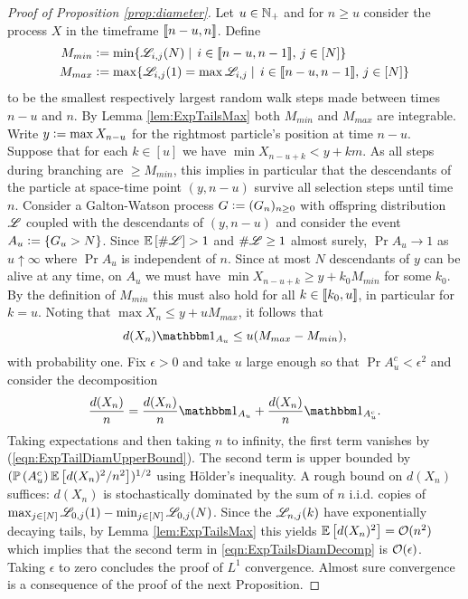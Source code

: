 \begin{proof}[Proof of Proposition \ref{prop:diameter}]
Let $u \in \N_+$ and for $n \geq u$ consider the process $X$ in the timeframe $\bbracket{n - u, n}$. Define 
\begin{align*}
M_{min} &\defeq \min\{ \scr{L}_{i, j}(N) \mid\, i \in \bbracket{n-u, n-1},\, j \in [N]\} \\
M_{max} &\defeq \max\{ \scr{L}_{i, j}(1) = \max\scr{L}_{i,j} \mid\, i \in \bbracket{n-u, n-1},\, j \in [N]\}
\end{align*} 
to be the smallest respectively largest random walk steps made between times $n-u$ and $n$. By Lemma \ref{lem:ExpTailsMax} both $M_{min}$ and $M_{max}$ are integrable. Write $y \defeq \max X_{n - u}$ for the rightmost particle's position at time $n-u$. \\

Suppose that for each $k \in [u]$ we have $\min X_{n - u + k} < y + k m$. As all steps during branching are $ \geq M_{min}$, this implies in particular that the descendants of the particle at space-time point $(y, n-u)$ survive all selection steps until time $n$. Consider a Galton-Watson process $G \defeq (G_n)_{n \geq 0}$ with offspring distribution $\scr{L}$ coupled with the descendants of $(y, n-u)$ and consider the event $A_u \defeq \{ G_u > N\}$. Since $\Ex{\#\scr{L}} > 1$ and $\#\scr{L} \geq 1$ almost surely, $\Pr{A_u} \to 1$ as $u \uparrow \infty$ where $\Pr{A_u}$ is independent of $n$. Since at most $N$ descendants of $y$ can be alive at any time, on $A_u$ we must have $\min X_{n - u + k} \geq y + k_0 M_{min}$ for some $k_0$. By the definition of $M_{min}$ this must also hold for all $k \in \bbracket{k_0, u}$, in particular for $k = u$. Noting that $\max X_n \leq y + u M_{max}$, it follows that 
\begin{equation}\label{eqn:ExpTailDiamUpperBound}
d(X_n)\Ind_{A_u} \leq u (M_{max} - M_{min}), 
\end{equation}
with probability one. Fix $\epsilon > 0$ and take $u$ large enough so that $\Pr{A_u^c} < \epsilon^2$ and consider the decomposition
\begin{equation}\label{eqn:ExpTailsDiamDecomp}
\frac{d(X_n)}{n} = \frac{d(X_n)}{n} \Ind_{A_u} + \frac{d(X_n)}{n} \Ind_{A_u^c}. 
\end{equation}
Taking expectations and then taking $n$ to infinity, the first term vanishes by (\ref{eqn:ExpTailDiamUpperBound}). The second term is upper bounded by $(\Pr{A_u^c} \Ex{d(X_n)^2 / n^2})^{1/2}$ using Hölder's inequality. A rough bound on $d(X_n)$ suffices: $d(X_n)$ is stochastically dominated by the sum of $n$ i.i.d. copies of $\max_{j \in [N]} \scr{L}_{0, j}(1) - \min_{j \in [N]} \scr{L}_{0,j}(N)$. Since the $\scr{L}_{n,j}(k)$ have exponentially decaying tails, by Lemma \ref{lem:ExpTailsMax} this yields $\Ex{d(X_n)^2} = \cal{O}(n^2)$ which implies that the second term in \ref{eqn:ExpTailsDiamDecomp} is $\cal{O}(\epsilon)$. Taking $\epsilon$ to zero concludes the proof of $L^1$ convergence. Almost sure convergence is a consequence of the proof of the next Proposition. 
\end{proof}

